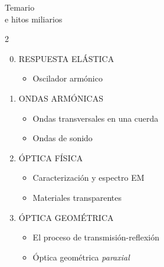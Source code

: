\documentclass[a4paper,12pt]{extarticle}
\title{\textbf{	}}
\date{}
\begin{document}
{}

\vspace*{-1cm}

\begin{mdframed}[backgroundcolor=blue!10]  
\center
{\Large Temario}\\\normalsize{e hitos miliarios}
\end{mdframed}

\vspace{1.5cm}


\begin{multicols}{2}

	\begin{enumerate}
	\setcounter{enumi}{-1}
	
 		\subsection*{ 	}
	 	\item  {\small RESPUESTA ELÁSTICA}
	 	  \begin{itemize}
	 	    \item Oscilador armónico
	 	  \end{itemize}
	 	  
	 	\item {\small ONDAS ARMÓNICAS}
	 		
	 		\begin{itemize}
	 			\item Ondas transversales en una cuerda 
	 			\item Ondas de sonido 	
	 		\end{itemize}

	 	\item {\small ÓPTICA FÍSICA}
	 
	 			\begin{itemize}
	 				\item Caracterización y espectro {\scriptsize EM}
					\item Materiales transparentes
	 			\end{itemize}
		
			
	 	\item  {\small ÓPTICA GEOMÉTRICA}
		 		\begin{itemize}
		 			\item El proceso de transmisión-reflexión
	 				\item Óptica geométrica \textit{paraxial}  		
	 			\end{itemize}


\end{enumerate}
\end{multicols}
\end{document}
